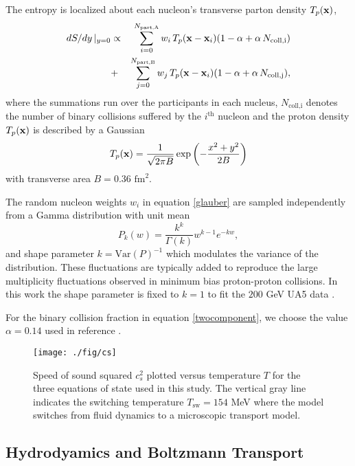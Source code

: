 \documentclass[aps,prc,reprint,amsmath,nofootinbib,superscriptaddress]{revtex4-1}
\begin{document}
The entropy is localized about each nucleon's transverse parton density $T_p({\bf x})$,
\begin{eqnarray}
 dS/dy \,\vert_{y=0} &\propto& \sum\limits_{i=0}^{N_\text{part,A}} w_i\, T_p({\bf x} - {\bf x}_i)(1-\alpha + \alpha\, N_\text{coll,i}) \nonumber \\
                     &+& \sum\limits_{j=0}^{N_\text{part,B}} w_j\, T_p({\bf x} - {\bf x}_i)(1-\alpha + \alpha\, N_\text{coll,j}),
 \label{glauber}
\end{eqnarray}
where the summations run over the participants in each nucleus, $N_\text{coll,i}$ denotes the number of binary collisions suffered by the $i^\text{th}$ nucleon 
and the proton density $T_p({\bf x})$ is described by a Gaussian
\begin{equation}
 T_p({\bf x}) = \frac{1}{\sqrt{2 \pi B}} \exp \left(-\frac{x^2+y^2}{2 B} \right)
\end{equation}
with transverse area $B = 0.36$ $\text{fm}^2$.

The random nucleon weights $w_i$ in equation \eqref{glauber} are sampled independently from a Gamma distribution with unit mean
\begin{equation}
 P_k(w) = \frac{k^k}{\Gamma(k)} w^{k-1} e^{-k w},
\end{equation}
and shape parameter $k = \text{Var}(P)^{-1}$ which modulates the variance of the distribution. 
These fluctuations are typically added \cite{?} to reproduce the large multiplicity fluctuations observed in minimum bias proton-proton collisions. 
In this work the shape parameter is fixed to $k=1$ to fit the $200$ GeV UA5 data \cite{?}. 

For the binary collision fraction in equation \eqref{twocomponent}, we choose the value $\alpha=0.14$ used in reference \cite{?}.

\begin{figure}
  \texttt{[image: ./fig/cs]}
  \caption{\label{fig:cs} Speed of sound squared $c_s^2$ plotted versus temperature $T$ for the three equations of state used in this study. The vertical
	   gray line indicates the switching temperature $T_\text{sw} = 154$ MeV where the model switches from fluid dynamics to a microscopic transport model.}
\end{figure}

\subsection{Hydrodyamics and Boltzmann Transport}
\end{document}
